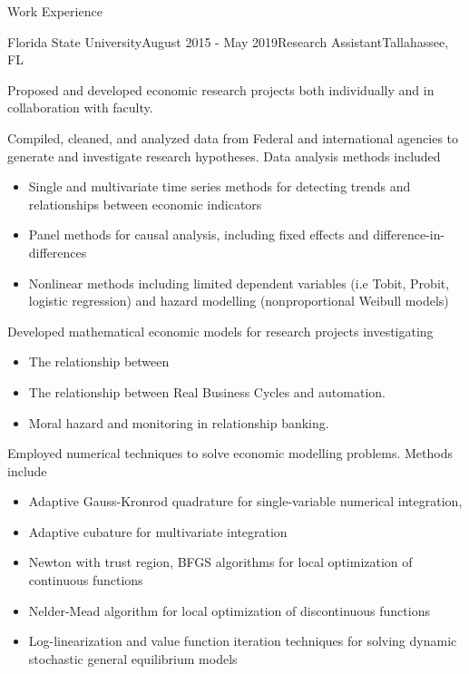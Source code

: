\documentclass{resume} %
\begin{document}
\begin{rSection}{Work Experience}
\begin{rSubsection}{Florida State University}{August 2015 - May 2019}{Research Assistant}{Tallahassee, FL}
    \item Proposed and developed economic research projects both individually and in collaboration with faculty.
    \item Compiled, cleaned, and analyzed data from Federal and international agencies to generate and investigate research hypotheses. Data analysis methods included
    \begin{itemize}
        \item Single and multivariate time series methods for detecting trends and relationships between economic indicators
        \item Panel methods for causal analysis, including fixed effects and difference-in-differences
        \item Nonlinear methods including limited dependent variables (i.e Tobit, Probit, logistic regression) and hazard modelling (nonproportional Weibull models)
    \end{itemize}
    \item Developed mathematical economic models for research projects investigating
    \begin{itemize}
        \item The relationship between 
        \item The relationship between Real Business Cycles and automation.
        \item Moral hazard and monitoring in relationship banking.
    \end{itemize}
    \item Employed numerical techniques to solve economic modelling problems. Methods include 
    \begin{itemize}
        \item Adaptive Gauss-Kronrod quadrature for single-variable numerical integration, 
        \item Adaptive cubature for multivariate integration
        \item Newton with trust region, BFGS algorithms for local optimization of continuous functions
        \item Nelder-Mead algorithm for local optimization of discontinuous functions 
        \item Log-linearization and value function iteration techniques for solving dynamic stochastic general equilibrium models
    \end{itemize} 
    

\end{rSubsection}
\end{rSection}
\end{document}
